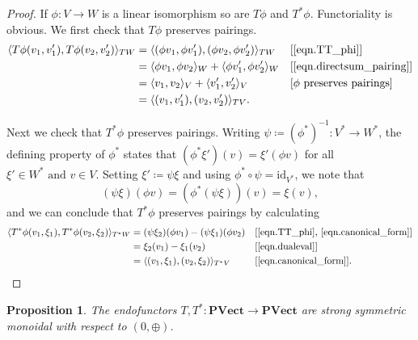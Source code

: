 \documentclass[11pt, oneside, article]{memoir}
\theoremstyle{definition}
\theoremstyle{plain}
\newtheorem{proposition}[proposition]{Proposition}
\DeclarePairedDelimiter{\pairing}{\langle}{\rangle}
\newcommand{\Cat}[1]{\mathbf{#1}}%
\newcommand{\id}{\mathrm{id}}
\newcommand{\inv}{^{-1}}
\newcommand{\pvect}{\Cat{PVect}}
\begin{document}
\begin{proof}
If $\phi\colon V\to W$ is a linear isomorphism so are $T\phi$ and $T^*\phi$. Functoriality is obvious. We first check that $T\phi$ preserves pairings.
\begin{align*}
\pairing{T\phi(v_1,v_1'),T\phi(v_2,v_2')}_{TW}
&= \pairing{(\phi v_1,\phi v_1'),(\phi v_2,\phi v_2')}_{TW} && \text{[\eqref{eqn.TT_phi}]}\\
&= \pairing{\phi v_1,\phi v_2}_W+\pairing{\phi v_1',\phi v_2'}_W && \text{[\eqref{eqn.directsum_pairing}]}\\
&= \pairing{v_1,v_2}_V+\pairing{v_1',v_2'}_V && \text{[$\phi$ preserves pairings]}\\
&= \pairing{(v_1,v_1'),(v_2,v_2')}_{TV}.
\end{align*}

Next we check that $T^*\phi$ preserves pairings. Writing $\psi\coloneqq(\phi^*)\inv\colon V^*\to W^*$, the defining property of $\phi^*$ states that $(\phi^*\xi')(v) = \xi'(\phi v)$ for all $\xi'\in W^*\text{ and }v\in V.$ Setting $\xi'\coloneqq\psi\xi$ and using $\phi^*\circ\psi=\id_{V^*}$, we note that
\begin{equation}\label{eqn.dualeval}
(\psi\xi)(\phi v) = (\phi^*(\psi\xi))(v) = \xi(v),
\end{equation}
and we can conclude that $T^*\phi$ preserves pairings by calculating
\begin{align*}
\pairing{T^*\phi(v_1,\xi_1),T^*\phi(v_2,\xi_2)}_{T^*W}
&= (\psi\xi_2)(\phi v_1)-(\psi\xi_1)(\phi v_2) && \text{[\eqref{eqn.TT_phi}, \eqref{eqn.canonical_form}]}\\
&= \xi_2(v_1)-\xi_1(v_2) && \text{[\eqref{eqn.dualeval}]}\\
&= \pairing{(v_1,\xi_1),(v_2,\xi_2)}_{T^*V} && \text{[\eqref{eqn.canonical_form}]}.
\end{align*}
\end{proof}

\begin{proposition}\label{prop.TT_monoidal}
The endofunctors $T,T^*\colon\pvect\to\pvect$ are strong symmetric monoidal with respect to $(0,\oplus)$.
\end{proposition}
\end{document}
